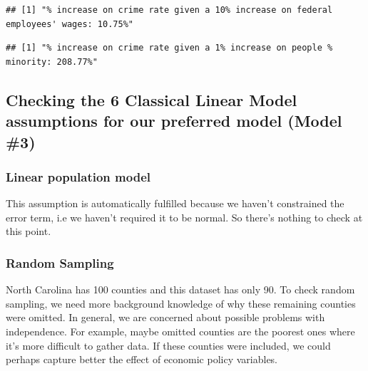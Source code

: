 \documentclass[]{article}
\newenvironment{Shaded}{\begin{snugshade}}{\end{snugshade}}
\newcommand{\DecValTok}[1]{\textcolor[rgb]{0.00,0.00,0.81}{#1}}
\newcommand{\KeywordTok}[1]{\textcolor[rgb]{0.13,0.29,0.53}{\textbf{#1}}}
\newcommand{\NormalTok}[1]{#1}
\newcommand{\OperatorTok}[1]{\textcolor[rgb]{0.81,0.36,0.00}{\textbf{#1}}}
\newcommand{\StringTok}[1]{\textcolor[rgb]{0.31,0.60,0.02}{#1}}
\begin{document}
\begin{verbatim}
## [1] "% increase on crime rate given a 10% increase on federal employees' wages: 10.75%"
\end{verbatim}

\begin{Shaded}
\end{Shaded}

\begin{verbatim}
## [1] "% increase on crime rate given a 1% increase on people % minority: 208.77%"
\end{verbatim}

\hypertarget{checking-the-6-classical-linear-model-assumptions-for-our-preferred-model-model-3}{%
\subsection{Checking the 6 Classical Linear Model assumptions for our
preferred model (Model
\#3)}\label{checking-the-6-classical-linear-model-assumptions-for-our-preferred-model-model-3}}

\hypertarget{linear-population-model}{%
\subsubsection{Linear population model}\label{linear-population-model}}

This assumption is automatically fulfilled because we haven't
constrained the error term, i.e we haven't required it to be normal. So
there's nothing to check at this point.

\hypertarget{random-sampling}{%
\subsubsection{Random Sampling}\label{random-sampling}}

North Carolina has 100 counties and this dataset has only 90. To check
random sampling, we need more background knowledge of why these
remaining counties were omitted. In general, we are concerned about
possible problems with independence. For example, maybe omitted counties
are the poorest ones where it's more difficult to gather data. If these
counties were included, we could perhaps capture better the effect of
economic policy variables.
\end{document}
